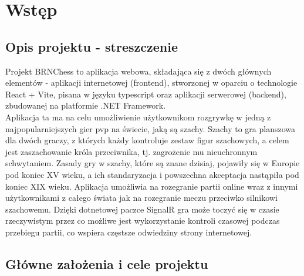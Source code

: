 \documentclass[12pt,a4paper]{article}
\begin{document}
\newpage

\tableofcontents

\newpage

\section{Wstęp}
\subsection{Opis projektu - streszczenie}
    

Projekt BRNChess to aplikacja webowa, składająca się z dwóch głównych elementów - aplikacji internetowej (frontend), stworzonej w oparciu o technologie React + Vite, pisana w języku typescript oraz aplikacji serwerowej (backend), zbudowanej na platformie .NET Framework. 
\\

Aplikacja ta ma na celu umożliwienie użytkownikom rozgrywkę w jedną z najpopularniejszych gier pvp na świecie, jaką są szachy. Szachy to gra planszowa dla dwóch graczy, z których każdy kontroluje zestaw figur szachowych, a celem jest zaszachowanie króla przeciwnika, tj. zagrożenie mu nieuchronnym schwytaniem. Zasady gry w szachy, które są znane dzisiaj, pojawiły się w Europie pod koniec XV wieku, a ich standaryzacja i powszechna akceptacja nastąpiła pod koniec XIX wieku. Aplikacja umożliwia na rozegranie partii online wraz z innymi użytkownikami z całego świata jak na rozegranie meczu przeciwko silnikowi szachowemu. Dzięki dotnetowej paczce SignalR gra może toczyć się w czasie rzeczywistym przez co możliwe jest wykorzystanie kontroli czasowej podczas przebiegu partii, co wspiera częstsze odwiedziny strony internetowej.

\subsection{Główne założenia i cele projektu}
\end{document}
